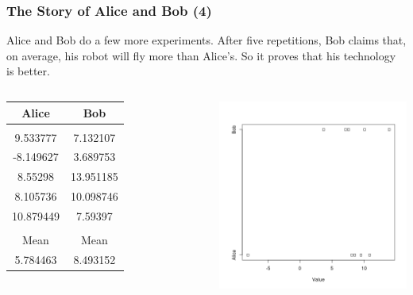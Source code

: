 \documentclass[10pt]{beamer}
\begin{document}
\begin{frame}
  \frametitle{The Story of Alice and Bob (4)}
  \begin{block}{}
    Alice and Bob do a few more experiments. After five repetitions,
    Bob claims that, on average, his robot will fly more than
    Alice's. So it proves that his technology is better.
  \end{block}
  \begin{columns}[c]
    \begin{tabular}{c|c}
      Alice & Bob \\
      \hline\\
      9.533777 & 7.132107\\
      -8.149627 & 3.689753\\
      8.55298 & 13.951185\\
      8.105736 & 10.098746\\
      10.879449 & 7.59397\\
      \hline
      \hline\\
      Mean & Mean\\
      5.784463 & 8.493152\\
    \end{tabular}
    \includegraphics[width=1\textwidth]{img/AliceBob_5}
  \end{columns}
\end{frame}
\end{document}
